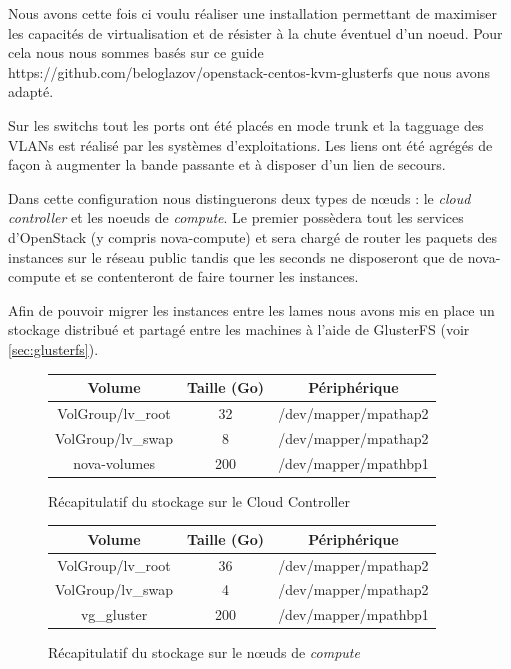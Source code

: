 \documentclass[a4paper,oneside]{report}
\begin{document}
Nous avons cette fois ci voulu réaliser une installation permettant de maximiser les capacités de virtualisation et de résister à la chute éventuel d'un noeud.
Pour cela nous nous sommes basés sur ce guide https://github.com/beloglazov/openstack-centos-kvm-glusterfs que nous avons adapté.

Sur les \glspl{switch} tout les ports ont été placés en mode trunk et la tagguage des VLANs est réalisé par les systèmes d'exploitations. Les liens ont été agrégés de façon à augmenter la bande passante et à disposer d'un lien de secours.

Dans cette configuration nous distinguerons deux types de nœuds : le \emph{cloud controller} et les noeuds de \emph{compute}. Le premier possèdera tout les services d'OpenStack (y compris nova-compute) et sera chargé de router les paquets des instances sur le réseau public tandis que les seconds ne disposeront que de nova-compute et se contenteront de faire tourner les instances.

Afin de pouvoir migrer les instances entre les lames nous avons mis en place un stockage distribué et partagé entre les machines à l'aide de GlusterFS (voir \ref{sec:glusterfs}).

\begin{figure}[h!]
\centering
\begin{tabular}{|c|c|c|}
\hline 
Volume & Taille (Go) & Périphérique \\ 
\hline 
VolGroup/lv\_root & 32 & /dev/mapper/mpathap2 \\ 
\hline 
VolGroup/lv\_swap & 8 & /dev/mapper/mpathap2 \\ 
\hline 
nova-volumes & 200 & /dev/mapper/mpathbp1
 \\ 
\hline 
\end{tabular}
\caption{Récapitulatif du stockage sur le Cloud Controller}
\end{figure}

\begin{figure}[h!]
\centering
\begin{tabular}{|c|c|c|}
\hline 
Volume & Taille (Go) & Périphérique \\ 
\hline 
VolGroup/lv\_root & 36 & /dev/mapper/mpathap2 \\ 
\hline 
VolGroup/lv\_swap & 4 & /dev/mapper/mpathap2 \\ 
\hline 
vg\_gluster & 200 & /dev/mapper/mpathbp1
 \\ 
\hline 
\end{tabular} 
\caption{Récapitulatif du stockage sur le nœuds de \emph{compute}}
\end{figure}
\end{document}
